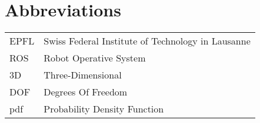 \section{Abbreviations}
\begin{flushleft}
\begin{tabular}{l l}
EPFL & Swiss Federal Institute of Technology in Lausanne\\
ROS & Robot Operative System\\
3D & Three-Dimensional\\
DOF & Degrees Of Freedom\\
pdf & Probability Density Function\\
\end{tabular}
\end{flushleft}

